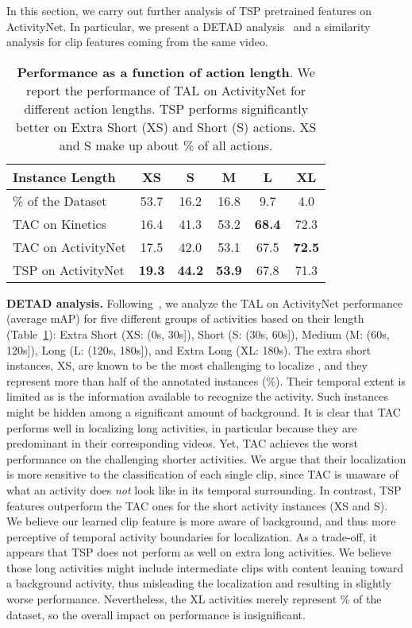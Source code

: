 \documentclass[10pt,twocolumn,letterpaper]{article}
\begin{document}
In this section, we carry out further analysis of TSP pretrained features on ActivityNet. In particular, we present a DETAD analysis~\cite{alwassel_eccv_2018} and a similarity analysis for clip features coming from the same video. 

\begin{table}[t!]
    \small
    \centering
    \caption{\textbf{Performance as a function of action length}. We report the performance of TAL on ActivityNet for different action lengths. TSP performs significantly better on Extra Short (XS) and Short (S) actions. XS and S make up about \% of all actions.
    }
    \vspace{-6pt}
    \begin{tabular}{l|ccccc}
\toprule
    Instance Length    &   XS   &   S    &   M    &   L    &   XL   \\\midrule
    \% of the Dataset  &   53.7 &   16.2 &   16.8 &   9.7  &   4.0  \\\midrule
    TAC on Kinetics    &   16.4 &   41.3 &   53.2 &\bf68.4 &   72.3 \\
    TAC on ActivityNet &   17.5 &   42.0 &   53.1 &   67.5 &\bf72.5 \\
    TSP on ActivityNet &\bf19.3 &\bf44.2 &\bf53.9 &   67.8 &   71.3 \\
\bottomrule
    \end{tabular}
    \label{table:analysis_detad}
\end{table}
 

 \vspace{3pt}\noindent\textbf{DETAD analysis.}
Following~\cite{alwassel_eccv_2018}, we analyze the TAL on ActivityNet performance (average mAP) for five different groups of activities based on their length (Table~\ref{table:analysis_detad}): Extra Short (XS: (0s, 30s]), Short (S: (30s, 60s]), Medium (M: (60s, 120s]), Long (L: (120s, 180s]), and Extra Long (XL:  180s). The extra short instances, XS, are known to be the most challenging to localize \cite{alwassel_eccv_2018}, and they represent more than half of the annotated instances (\%). Their temporal extent is limited as is the information available to recognize the activity. Such instances might be hidden among a significant amount of background.
It is clear that TAC performs well in localizing long activities, in particular because they are predominant in their corresponding videos. Yet, TAC achieves the worst performance on the challenging shorter activities. We argue that their localization is more sensitive to the classification of each single clip, since TAC is unaware of what an activity does \textit{not} look like in its temporal surrounding.
In contrast, TSP features outperform the TAC ones for the short activity instances (XS and S). We believe our learned clip feature is more aware of background, and thus more perceptive of temporal activity boundaries for localization. 
As a trade-off, it appears that TSP does not perform as well on extra long activities. We believe those long activities might include intermediate clips with content leaning toward a background activity, thus misleading the localization and resulting in slightly worse performance. Nevertheless, the XL activities merely represent \% of the dataset, so the overall impact on performance is insignificant.
\end{document}

